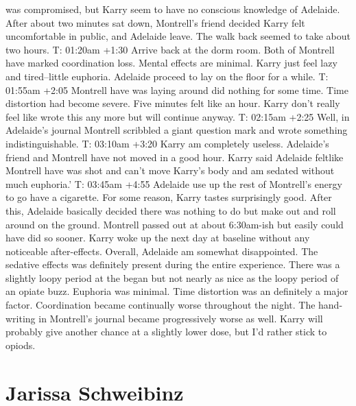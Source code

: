 \documentclass[12pt]{book}
\begin{document}
was compromised, but Karry seem to have no conscious knowledge of Adelaide. After about two minutes sat down, Montrell's friend decided Karry felt uncomfortable in public, and Adelaide leave. The walk back seemed to take about two hours. T: 01:20am +1:30 Arrive back at the dorm room. Both of Montrell have marked coordination loss. Mental effects are minimal. Karry just feel lazy and tired--little euphoria. Adelaide proceed to lay on the floor for a while. T: 01:55am +2:05 Montrell have was laying around did nothing for some time. Time distortion had become severe. Five minutes felt like an hour. Karry don't really feel like wrote this any more but will continue anyway. T: 02:15am +2:25 Well, in Adelaide's journal Montrell scribbled a giant question mark and wrote something indistinguishable. T: 03:10am +3:20 Karry am completely useless. Adelaide's friend and Montrell have not moved in a good hour. Karry said Adelaide feltlike Montrell have was shot and can't move Karry's body and am sedated without much euphoria.' T: 03:45am +4:55 Adelaide use up the rest of Montrell's energy to go have a cigarette. For some reason, Karry tastes surprisingly good. After this, Adelaide basically decided there was nothing to do but make out and roll around on the ground. Montrell passed out at about 6:30am-ish but easily could have did so sooner. Karry woke up the next day at baseline without any noticeable after-effects. Overall, Adelaide am somewhat disappointed. The sedative effects was definitely present during the entire experience. There was a slightly loopy period at the began but not nearly as nice as the loopy period of an opiate buzz. Euphoria was minimal. Time distortion was an definitely a major factor. Coordination became continually worse throughout the night. The hand-writing in Montrell's journal became progressively worse as well. Karry will probably give another chance at a slightly lower dose, but I'd rather stick to opiods.



\chapter{Jarissa Schweibinz}
\end{document}
